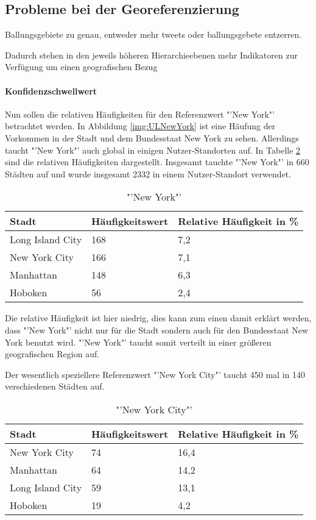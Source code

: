 		\subsection{Probleme bei der Georeferenzierung} 

		Ballungsgebiete zu genau, entweder mehr tweets oder ballungsgebete entzerren.

		Dadurch stehen in den jeweils höheren Hierarchieebenen mehr Indikatoren zur Verfügung um einen geografischen Bezug 

		\paragraph{Konfidenzschwellwert}


			Nun sollen die relativen Häufigkeiten für den Referenzwert "'New York"' betrachtet werden.
				In Abbildung \ref{img:ULNewYork} ist eine Häufung der Vorkommen in der Stadt und dem Bundesstaat New York zu sehen.
				Allerdings taucht "'New York"' auch global in einigen Nutzer-Standorten auf. 
				In Tabelle \ref{tab:newYork} sind die relativen Häufigkeiten dargestellt. 
				Insgesamt tauchte "'New York"' in 660 Städten auf und wurde insgesamt 2332 in einem Nutzer-Standort verwendet.

				\begin{table}[h]
				\centering
				\caption{"'New York"'}
				\label{tab:newYork}
				\begin{tabular}{|l|l|l|}
				Stadt            & Häufigkeitswert & Relative Häufigkeit in \% \\ \hline \hline
				Long Island City & 168 & 7,2 \\ \hline
				New York City    & 166 & 7,1 \\ \hline
				Manhattan        & 148 & 6,3 \\ \hline
				Hoboken          & 56  & 2,4 \\ \hline
				\end{tabular}
				\end{table} 

				Die relative Häufigkeit ist hier niedrig, dies kann zum einen damit erklärt werden, dass "'New York"' nicht nur für die Stadt sondern auch für den Bundesstaat New York benutzt wird.
				"'New York"' taucht somit verteilt in einer größeren geografischen Region auf. 

				Der wesentlich speziellere Referenzwert "'New York City"' taucht 450 mal in 140 verschiedenen Städten auf. 

				\begin{table}[h]
				\centering
				\caption{"'New York City"'}
				\label{tab:newYork}
				\begin{tabular}{|l|l|l|}
				Stadt            & Häufigkeitswert & Relative Häufigkeit in \% \\ \hline \hline
				New York City 	 & 74 & 16,4 \\ \hline
				Manhattan    	 & 64 & 14,2 \\ \hline
				Long Island City & 59 & 13,1 \\ \hline
				Hoboken          & 19 & 4,2 \\ \hline
				\end{tabular}
				\end{table} 

